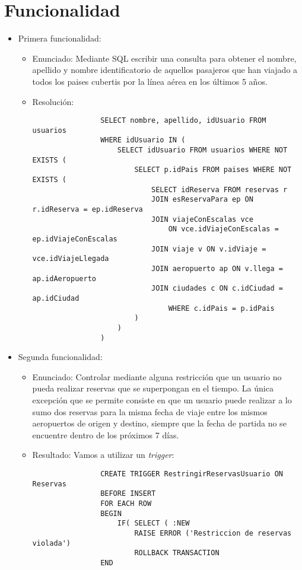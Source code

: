 \section{Funcionalidad}

\begin{itemize}
	\item Primera funcionalidad:
		\begin{itemize}
			\item Enunciado: Mediante SQL escribir una consulta para obtener el nombre, apellido y nombre
			identificatorio de aquellos pasajeros que han viajado a todos los paises cubertis por la l\'inea
			a\'erea en los \'ultimos 5 a\~nos.

			\item Resoluci\'on:

			\begin{lstlisting}
				SELECT nombre, apellido, idUsuario FROM usuarios
				WHERE idUsuario IN (
					SELECT idUsuario FROM usuarios WHERE NOT EXISTS (
						SELECT p.idPais FROM paises WHERE NOT EXISTS (
							SELECT idReserva FROM reservas r
							JOIN esReservaPara ep ON r.idReserva = ep.idReserva
							JOIN viajeConEscalas vce 
								ON vce.idViajeConEscalas = ep.idViajeConEscalas
							JOIN viaje v ON v.idViaje = vce.idViajeLlegada
							JOIN aeropuerto ap ON v.llega = ap.idAeropuerto
							JOIN ciudades c ON c.idCiudad = ap.idCiudad
								WHERE c.idPais = p.idPais
						)
					)
				)
			\end{lstlisting}
		\end{itemize}
	\item Segunda funcionalidad:
		\begin{itemize}
			\item Enunciado: Controlar mediante alguna restricci\'on que un usuario no pueda realizar
			reservas que se superpongan en el tiempo. La \'unica excepci\'on que se permite consiste en
			que un usuario puede realizar a lo sumo dos reservas para la misma fecha de viaje entre los
			mismos aeropuertos de origen y destino, siempre que la fecha de partida no se encuentre dentro
			de los pr\'oximos 7 d\'ias.
			\item Resultado: Vamos a utilizar un \textit{trigger}:

			\begin{lstlisting}
				CREATE TRIGGER RestringirReservasUsuario ON Reservas
				BEFORE INSERT
				FOR EACH ROW
				BEGIN
					IF( SELECT ( :NEW 
						RAISE ERROR ('Restriccion de reservas violada')
						ROLLBACK TRANSACTION
				END
			\end{lstlisting}
	
			\end{itemize}
\end{itemize}


